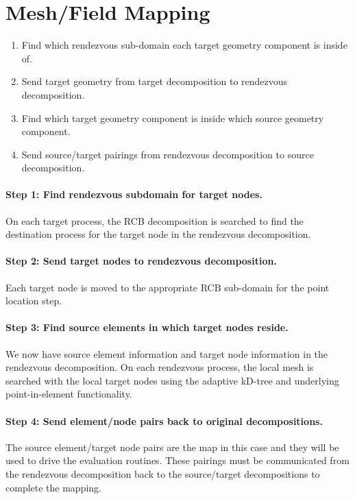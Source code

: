\documentclass[letterpaper,12pt]{article}
\begin{document}
\clearpage

\section{Mesh/Field Mapping}\label{sec:map}

\begin{enumerate}
\item Find which rendezvous sub-domain each target geometry component
  is inside of.
\item Send target geometry from target decomposition to rendezvous
  decomposition.
\item Find which target geometry component is inside which source
  geometry component.
\item Send source/target pairings from rendezvous decomposition to
  source decomposition.
\end{enumerate}

\paragraph{Step 1: Find rendezvous subdomain for target nodes.}
On each target process, the RCB decomposition is searched to find the
destination process for the target node in the rendezvous
decomposition.

\paragraph{Step 2: Send target nodes to rendezvous decomposition.}
Each target node is moved to the appropriate RCB sub-domain for the
point location step.

\paragraph{Step 3: Find source elements in which target nodes reside.}
We now have source element information and target node information in
the rendezvous decomposition. On each rendezvous process, the local
mesh is searched with the local target nodes using the adaptive
kD-tree and underlying point-in-element functionality.

\paragraph{Step 4: Send element/node pairs back to original
  decompositions.}  The source element/target node pairs are the map
in this case and they will be used to drive the evaluation
routines. These pairings must be communicated from the rendezvous
decomposition back to the source/target decompositions to complete the
mapping.
\end{document}
